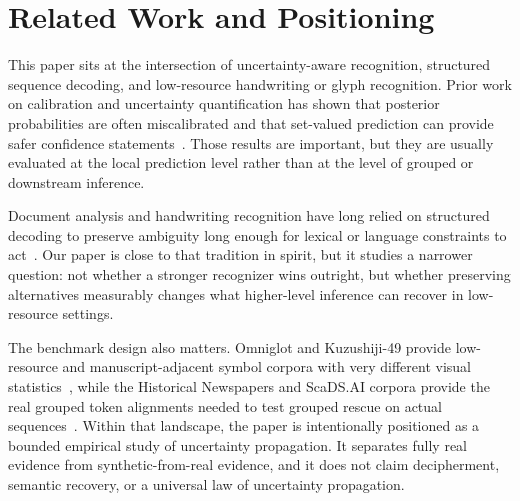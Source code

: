 \section{Related Work and Positioning}

This paper sits at the intersection of uncertainty-aware recognition, structured sequence decoding, and low-resource handwriting or glyph recognition. Prior work on calibration and uncertainty quantification has shown that posterior probabilities are often miscalibrated and that set-valued prediction can provide safer confidence statements~\cite{guo2017calibration,angelopoulos2021conformal}. Those results are important, but they are usually evaluated at the local prediction level rather than at the level of grouped or downstream inference.

Document analysis and handwriting recognition have long relied on structured decoding to preserve ambiguity long enough for lexical or language constraints to act~\cite{plamondon2000handwriting,graves2006ctc,scheidl2018wordbeam}. Our paper is close to that tradition in spirit, but it studies a narrower question: not whether a stronger recognizer wins outright, but whether preserving alternatives measurably changes what higher-level inference can recover in low-resource settings.

The benchmark design also matters. Omniglot and Kuzushiji-49 provide low-resource and manuscript-adjacent symbol corpora with very different visual statistics~\cite{lake2015omniglot,clanuwat2018kuzushiji}, while the Historical Newspapers and ScaDS.AI corpora provide the real grouped token alignments needed to test grouped rescue on actual sequences~\cite{historical_newspapers_gt,scadsai_grouped_words}. Within that landscape, the paper is intentionally positioned as a bounded empirical study of uncertainty propagation. It separates fully real evidence from synthetic-from-real evidence, and it does not claim decipherment, semantic recovery, or a universal law of uncertainty propagation.
